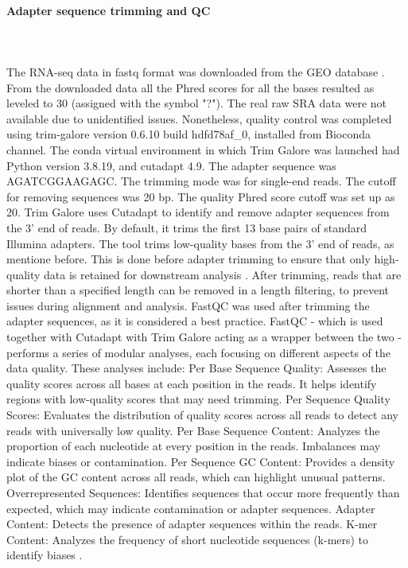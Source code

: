\documentclass[12pt]{article}
\begin{document}
\paragraph{Adapter sequence trimming and QC}\hspace{0pt}\\\\
The RNA-seq data in fastq format was downloaded from the GEO database \supercite{samples}. From the downloaded data all the Phred scores for all the bases resulted as leveled to 30 (assigned with the symbol "?"). The real raw SRA data were not available due to unidentified issues. Nonetheless, quality control was completed using trim-galore version 0.6.10 build hdfd78af\_0, installed from Bioconda channel. The conda virtual environment in which Trim Galore was launched had Python version 3.8.19, and cutadapt 4.9. The adapter sequence was AGATCGGAAGAGC. The trimming mode was for single-end reads. The cutoff for removing sequences was 20 bp. The quality Phred score cutoff was set up as 20. Trim Galore uses Cutadapt to identify and remove adapter sequences from the 3' end of reads. By default, it trims the first 13 base pairs of standard Illumina adapters. The tool trims low-quality bases from the 3' end of reads, as mentione before. This is done before adapter trimming to ensure that only high-quality data is retained for downstream analysis \supercite{trim_galore}. After trimming, reads that are shorter than a specified length can be removed in a length filtering, to prevent issues during alignment and analysis. FastQC  was used after trimming the adapter sequences, as it is considered a best practice. FastQC - which is used together with Cutadapt with Trim Galore acting as a wrapper between the two - performs a series of modular analyses, each focusing on different aspects of the data quality. These analyses include:
Per Base Sequence Quality: Assesses the quality scores across all bases at each position in the reads. It helps identify regions with low-quality scores that may need trimming.
Per Sequence Quality Scores: Evaluates the distribution of quality scores across all reads to detect any reads with universally low quality.
Per Base Sequence Content: Analyzes the proportion of each nucleotide at every position in the reads. Imbalances may indicate biases or contamination.
Per Sequence GC Content: Provides a density plot of the GC content across all reads, which can highlight unusual patterns.
Overrepresented Sequences: Identifies sequences that occur more frequently than expected, which may indicate contamination or adapter sequences.
Adapter Content: Detects the presence of adapter sequences within the reads. 
K-mer Content: Analyzes the frequency of short nucleotide sequences (k-mers) to identify biases \supercite{fastqc}. 
\end{document}
